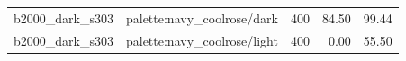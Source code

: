\begin{longtable}{l>{\raggedright\arraybackslash}p{.42\linewidth}rrr}
b2000\_\allowbreak{}dark\_\allowbreak{}s303 & %
palette:navy\_\allowbreak{}coolrose/dark & %
400 & %
84.50 & %
99.44 \\ %

b2000\_\allowbreak{}dark\_\allowbreak{}s303 & %
palette:navy\_\allowbreak{}coolrose/light & %
400 & %
0.00 & %
55.50 \\ %


\end{longtable}
